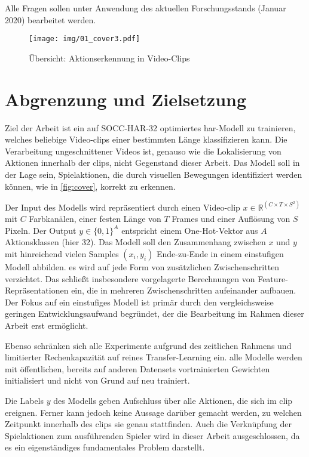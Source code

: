 Alle Fragen sollen unter Anwendung des aktuellen Forschungsstands (Januar 2020) bearbeitet werden.

\begin{figure}[htbp]
    \centering
    \texttt{[image: img/01\_cover3.pdf]}
    \caption{Übersicht: Aktionserkennung in Video-Clips }
    \label{fig:cover}
\end{figure}

\section{Abgrenzung und Zielsetzung}
\label{sec:zielsetzung}

Ziel der Arbeit ist ein auf SOCC-HAR-32 optimiertes \gls{har}-Modell zu trainieren, welches beliebige Video-\glspl{clip} einer bestimmten Länge klassifizieren kann.
Die Verarbeitung ungeschnittener Videos ist, genauso wie die Lokalisierung von Aktionen innerhalb der \glspl{clip}, nicht Gegenstand dieser Arbeit.
Das Modell soll in der Lage sein, Spielaktionen, die durch visuellen Bewegungen identifiziert werden können, wie in \autoref{fig:cover}, korrekt zu erkennen.

Der Input des Modells wird repräsentiert durch einen Video-\gls{clip} $x \in \mathbb{R}^{(C \times T \times S^2)}$ mit $C$ Farbkanälen, einer festen Länge von $T$ Frames und einer Auflösung von $S$ Pixeln.
Der Output $y \in \{0, 1\}^A$ entspricht einem One-Hot-Vektor aus $A$ Aktionsklassen (hier 32).
Das Modell soll den Zusammenhang zwischen $x$ und $y$ mit hinreichend vielen Samples $(x_i, y_i)$ Ende-zu-Ende in einem einstufigen Modell abbilden.
\Dh es wird auf jede Form von zusätzlichen Zwischenschritten verzichtet.
Das schließt insbesondere vorgelagerte Berechnungen von Feature-Repräsentationen ein, die in mehreren Zwischenschritten aufeinander aufbauen.
Der Fokus auf ein einstufiges Modell ist primär durch den vergleichsweise geringen Entwicklungsaufwand begründet, der die Bearbeitung im Rahmen dieser Arbeit erst ermöglicht.

Ebenso schränken sich alle Experimente aufgrund des zeitlichen Rahmens und limitierter Rechenkapazität auf reines Transfer-Learning ein.
\Dh alle Modelle werden mit öffentlichen, bereits auf anderen Datensets vortrainierten Gewichten initialisiert und nicht von Grund auf neu trainiert.

Die Labels $y$ des Modells geben Aufschluss über alle Aktionen, die sich im \gls{clip} ereignen.
Ferner kann jedoch keine Aussage darüber gemacht werden, zu welchen Zeitpunkt innerhalb des \glspl{clip} sie genau stattfinden.
Auch die Verknüpfung der Spielaktionen zum ausführenden Spieler wird in dieser Arbeit ausgeschlossen, da es ein eigenständiges fundamentales Problem darstellt.

